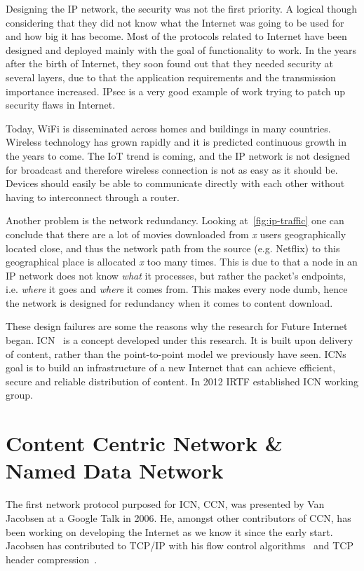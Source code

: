 Designing the \gls{IP} network, the security was not the first priority.
A logical though considering that they did not know what the Internet was going to be used for and how big it has become.
Most of the protocols related to Internet have been designed and deployed mainly with the goal of functionality to work.
In the years after the birth of Internet, they soon found out that they needed security at several layers, due to that the application requirements and the transmission importance increased.
\gls{IPsec} is a very good example of work trying to patch up security flaws in Internet.

Today, WiFi is disseminated across homes and buildings in many countries. 
Wireless technology has grown rapidly and it is predicted continuous growth in the years to come. 
The \gls{IoT} trend is coming, and the \gls{IP} network is not designed for broadcast and therefore wireless connection is not as easy as it should be.
Devices should easily be able to communicate directly with each other without having to interconnect through a router.

Another problem is the network redundancy. 
Looking at~\autoref{fig:ip-traffic} one can conclude that there are a lot of movies downloaded from \textit{x} users geographically located close, and thus the network path from the source (e.g. Netflix) to this geographical place is allocated \textit{x} too many times. 
This is due to that a node in an \gls{IP} network does not know \textit{what} it processes, but rather the packet's endpoints, i.e. \textit{where} it goes and \textit{where} it comes from. 
This makes every node dumb, hence the network is designed for redundancy when it comes to content download.

These design failures are some the reasons why the research for Future Internet began.  
\gls{ICN}~\cite{DBLP:journals/cm/AhlgrenDIKO12} is a concept developed under this research.
It is built upon delivery of content, rather than the point-to-point model we previously have seen.
\gls{ICN}s goal is to build an infrastructure of a new Internet that can achieve efficient, secure and reliable distribution of content.
In 2012 \gls{IRTF} established \gls{ICN} working group.


\section{Content Centric Network \& Named Data Network}\label{chp2:sec:icn}
The first network protocol purposed for \gls{ICN}, \gls{CCN}, was presented by Van Jacobsen at a Google Talk in 2006. 
He, amongst other contributors of \gls{CCN}, has been working on developing the Internet as we know it since the early start.
Jacobsen has contributed to \gls{TCP}/\gls{IP} with his flow control algorithms~\cite{DBLP:conf/sigcomm/Jacobson88} and \gls{TCP} header compression~\cite{rfc1144}.

